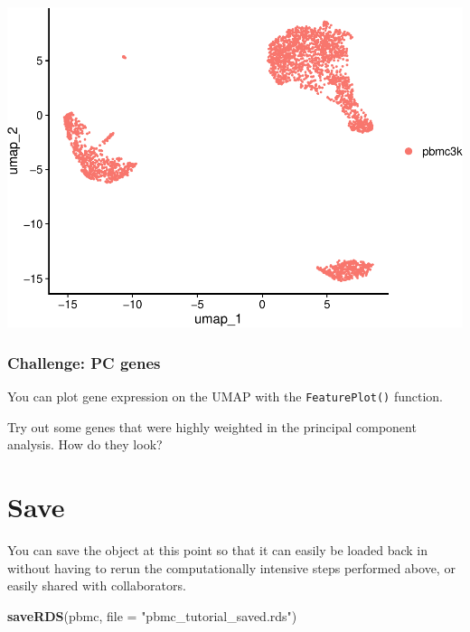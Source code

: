 \documentclass[
]{book}
\newenvironment{Shaded}{\begin{snugshade}}{\end{snugshade}}
\newcommand{\AttributeTok}[1]{\textcolor[rgb]{0.13,0.29,0.53}{#1}}
\newcommand{\FunctionTok}[1]{\textcolor[rgb]{0.13,0.29,0.53}{\textbf{#1}}}
\newcommand{\NormalTok}[1]{#1}
\newcommand{\StringTok}[1]{\textcolor[rgb]{0.31,0.60,0.02}{#1}}
\begin{document}
\includegraphics{scRNAseqInR_Doco_files/figure-latex/tsneplot-1.pdf}

\subsubsection*{Challenge: PC genes}\label{challenge-pc-genes}

You can plot gene expression on the UMAP with the \texttt{FeaturePlot()} function.

Try out some genes that were highly weighted in the principal component analysis. How do they look?

\subsubsection*{}\label{section-7}

\section{Save}\label{save}

You can save the object at this point so that it can easily be loaded back in without having to rerun the computationally intensive steps performed above, or easily shared with collaborators.

\begin{Shaded}
\begin{Highlighting}[]
\FunctionTok{saveRDS}\NormalTok{(pbmc, }\AttributeTok{file =} \StringTok{"pbmc\_tutorial\_saved.rds"}\NormalTok{) }
\end{Highlighting}
\end{Shaded}
\end{document}
